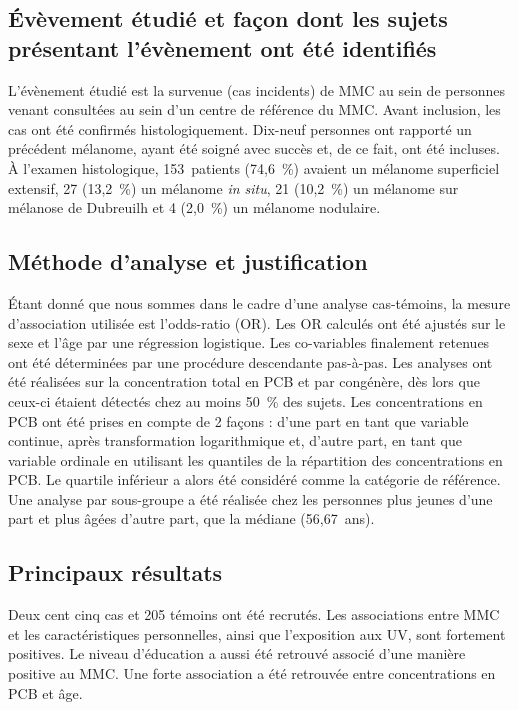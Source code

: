 \documentclass[10pt,english,french]{article}
\begin{document}
\subsection{\'{E}vèvement étudié et façon dont les sujets présentant l'évènement ont été identifiés}
L'évènement étudié est la survenue (cas incidents) de MMC au sein de personnes venant consultées au sein d'un centre de référence du MMC. Avant inclusion, les cas ont été confirmés histologiquement. Dix-neuf personnes ont rapporté un précédent mélanome, ayant été soigné avec succès et, de ce fait, ont été incluses. \`{A} l'examen histologique, 153~patients (74,6~\%) avaient un mélanome superficiel extensif, 27 (13,2~\%) un mélanome \emph{in situ}, 21 (10,2~\%) un mélanome sur mélanose de Dubreuilh et 4 (2,0~\%) un mélanome nodulaire.

\subsection{Méthode d'analyse et justification}
\'{E}tant donné que nous sommes dans le cadre d'une analyse cas-témoins, la mesure d'association utilisée est l'odds-ratio (OR). Les OR calculés ont été ajustés sur le sexe et l'âge par une régression logistique. Les co-variables finalement retenues ont été déterminées par une procédure descendante pas-à-pas. Les analyses ont été réalisées sur la concentration total en PCB et par congénère, dès lors que ceux-ci étaient détectés chez au moins 50~\% des sujets. Les concentrations en PCB ont été prises en compte de 2 façons : d'une part en tant que variable continue, après transformation logarithmique et, d'autre part, en tant que variable ordinale en utilisant les quantiles de la répartition des concentrations en PCB. Le quartile inférieur a alors été considéré comme la catégorie de référence. Une analyse par sous-groupe a été réalisée chez les personnes plus jeunes d'une part et plus âgées d'autre part, que la médiane (56,67~ans). 

\subsection{Principaux résultats}
Deux cent cinq cas et 205 témoins ont été recrutés. Les associations entre MMC et les caractéristiques personnelles, ainsi que l'exposition aux UV, sont fortement positives. Le niveau d'éducation a aussi été retrouvé associé d'une manière positive au MMC. Une forte association a été retrouvée entre concentrations en PCB et âge. 
\end{document}
